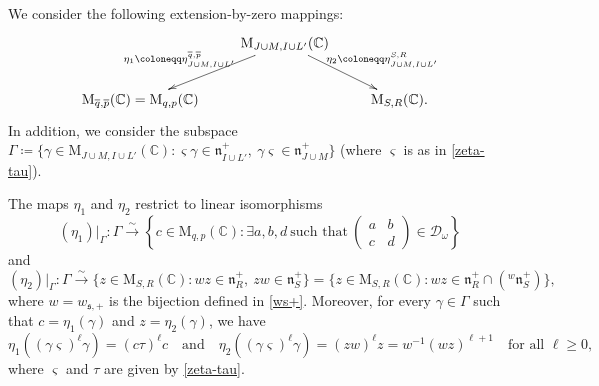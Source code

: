\documentclass[ALCO,Unicode]{cedram}
\newcommand{\fs}{\mathfrak{s}}
\newcommand{\fn}{\mathfrak{n}}
\newcommand{\Mat}{\mathrm{M}}
\newcommand{\condir}{\mathcal{D}}
\newcommand{\intp}{\overline{p}}
\newcommand{\intq}{\overline{q}}
\newcommand{\mC}{\mathbb{C}}
\begin{document}
We consider the following extension-by-zero mappings:
\[
\xymatrix{
& \ar_{\eta_1\coloneqq \eta_{J\cup M,I\cup L'}^{\intq,\intp}\quad}[ld] \Mat_{J\cup M,I\cup L'}(\mC) \ar^{\quad\eta_2\coloneqq \eta_{J\cup M,I\cup L'\\ }^{S,R}}[rd] &\\
\Mat_{\intq,\intp}(\mC)=\Mat_{q,p}(\mC) &  & \Mat_{S,R}(\mC).}
\]
In addition, we consider the subspace $\Gamma\coloneqq \{\gamma\in \Mat_{J\cup M,I\cup L'}(\mC):\varsigma \gamma\in\fn_{I\cup L'}^+,\ \gamma\varsigma\in\fn_{J\cup M}^+\}$ (where $\varsigma$ is as in \eqref{zeta-tau}).

\begin{lemma}
\label{L4.9}
The maps $\eta_1$ and $\eta_2$ restrict to linear isomorphisms
\[(\eta_1)|_{\Gamma}:\Gamma\stackrel{\sim}{\longrightarrow} \left\{ c\in \Mat_{q,p}(\mC):\exists a,b,d\ \mbox{such that}\ \begin{pmatrix} a & b\\ c & d \end{pmatrix}\in\condir_\omega \right\}\]
and\[(\eta_2)|_\Gamma:\Gamma\stackrel{\sim}{\to} \{z\in\Mat_{S,R}(\mC):wz\in\fn_R^+,\ zw\in\fn_S^+\}=\{z\in\Mat_{S,R}(\mC):wz\in\fn_R^+\cap({}^w\fn_S^+)\},\]
where $w=w_{\fs,+}$ is the bijection defined in \eqref{ws+}.
Moreover, for every $\gamma\in\Gamma$ such that $c=\eta_1(\gamma)$ and $z=\eta_2(\gamma)$, we have
\[\eta_1((\gamma\varsigma)^{\ell}\gamma)=(c\tau)^\ell c\quad\mbox{and}\quad \eta_2((\gamma\varsigma)^\ell\gamma)=(zw)^\ell z=w^{-1}(wz)^{\ell+1}\quad\mbox{for all $\ell\geq 0$},\]
where $\varsigma$ and $\tau$ are given by \eqref{zeta-tau}.
\end{lemma}
\end{document}

